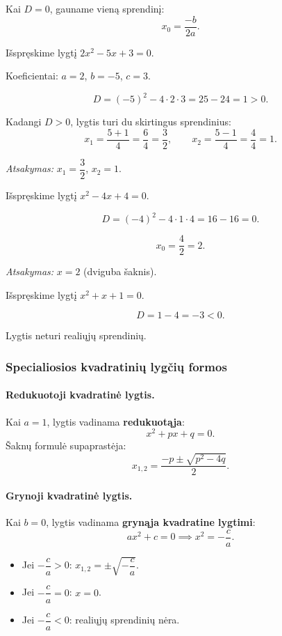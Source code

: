 Kai $D = 0$, gauname vieną sprendinį:
\[
x_0 = \frac{-b}{2a}.
\]

\begin{example}
Išspręskime lygtį $2x^2 - 5x + 3 = 0$.

Koeficientai: $a = 2$, $b = -5$, $c = 3$.

\[
D = (-5)^2 - 4 \cdot 2 \cdot 3 = 25 - 24 = 1 > 0.
\]

Kadangi $D > 0$, lygtis turi du skirtingus sprendinius:
\[
x_1 = \frac{5 + 1}{4} = \frac{6}{4} = \frac{3}{2}, \qquad x_2 = \frac{5 - 1}{4} = \frac{4}{4} = 1.
\]

\textit{Atsakymas:} $x_1 = \dfrac{3}{2}$, $x_2 = 1$.
\end{example}

\begin{example}
Išspręskime lygtį $x^2 - 4x + 4 = 0$.

\[
D = (-4)^2 - 4 \cdot 1 \cdot 4 = 16 - 16 = 0.
\]

\[
x_0 = \frac{4}{2} = 2.
\]

\textit{Atsakymas:} $x = 2$ (dviguba šaknis).
\end{example}

\begin{example}
Išspręskime lygtį $x^2 + x + 1 = 0$.

\[
D = 1 - 4 = -3 < 0.
\]

Lygtis neturi realiųjų sprendinių.
\end{example}

\subsubsection*{Specialiosios kvadratinių lygčių formos}

\paragraph{Redukuotoji kvadratinė lygtis.}
Kai $a = 1$, lygtis vadinama \textbf{redukuotąja}:
\[
x^2 + px + q = 0.
\]
Šaknų formulė supaprastėja:
\[
x_{1,2} = \frac{-p \pm \sqrt{p^2 - 4q}}{2}.
\]

\paragraph{Grynoji kvadratinė lygtis.}
Kai $b = 0$, lygtis vadinama \textbf{grynąja kvadratine lygtimi}:
\[
ax^2 + c = 0 \implies x^2 = -\frac{c}{a}.
\]
\begin{itemize}
    \item Jei $-\dfrac{c}{a} > 0$: $x_{1,2} = \pm\sqrt{-\dfrac{c}{a}}$.
    \item Jei $-\dfrac{c}{a} = 0$: $x = 0$.
    \item Jei $-\dfrac{c}{a} < 0$: realiųjų sprendinių nėra.
\end{itemize}

